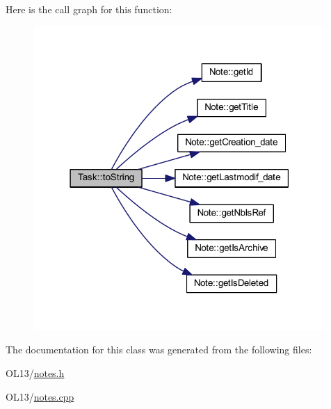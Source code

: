 Here is the call graph for this function\+:\nopagebreak
\begin{figure}[H]
\begin{center}
\leavevmode
\includegraphics[width=315pt]{class_task_a7fe5cb7b57a21693e7abfea2f9618563_cgraph}
\end{center}
\end{figure}


The documentation for this class was generated from the following files\+:\begin{DoxyCompactItemize}
\item 
O\+L13/\hyperlink{notes_8h}{notes.\+h}\item 
O\+L13/\hyperlink{notes_8cpp}{notes.\+cpp}\end{DoxyCompactItemize}
